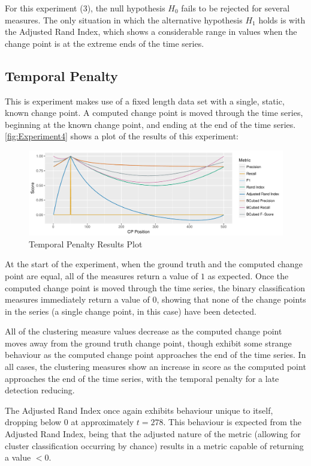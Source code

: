 \documentclass[../main.tex]{subfiles}
\begin{document}
For this experiment (3), the null hypothesis $H_0$ fails to be rejected for several measures. The only situation in which the alternative hypothesis $H_1$ holds is with the Adjusted Rand Index, which shows a considerable range in values when the change point is at the extreme ends of the time series.

\subsection{Temporal Penalty}

This is experiment makes use of a fixed length data set with a single, static, known change point. A computed change point is moved through the time series, beginning at the known change point, and ending at the end of the time series. \autoref{fig:Experiment4} shows a plot of the results of this experiment:

\begin{figure}[h]
    \includegraphics[width=\textwidth]{figures/Experiment3}
    \caption{Temporal Penalty Results Plot}
    \label{fig:Experiment4}
\end{figure}

At the start of the experiment, when the ground truth and the computed change point are equal, all of the measures return a value of $1$ as expected. Once the computed change point is moved through the time series, the binary classification measures immediately return a value of $0$, showing that none of the change points in the series (a single change point, in this case) have been detected.

All of the clustering measure values decrease as the computed change point moves away from the ground truth change point, though exhibit some strange behaviour as the computed change point approaches the end of the time series. In all cases, the clustering measures show an increase in score as the computed point approaches the end of the time series, with the temporal penalty for a late detection reducing.

The Adjusted Rand Index once again exhibits behaviour unique to itself, dropping below $0$ at approximately $t=278$. This behaviour is expected from the Adjusted Rand Index, being that the adjusted nature of the metric (allowing for cluster classification occurring by chance) results in a metric capable of returning a value $<0$.
\end{document}
